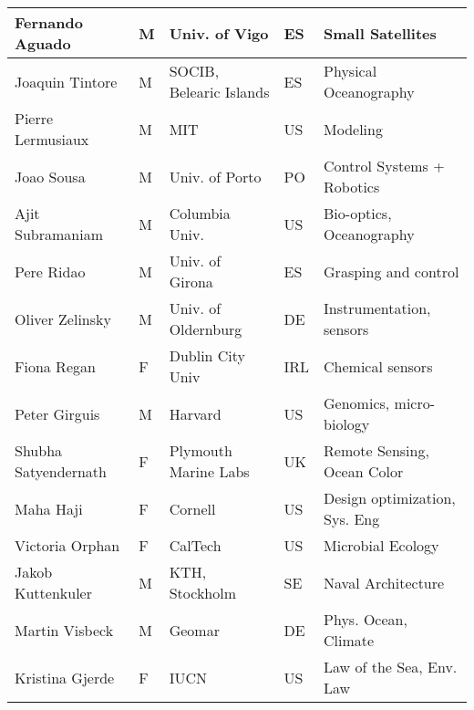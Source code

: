 \begin{table}[]
{\begin{tabular}{|p{3cm}|p{0.5cm}|p{3.5cm}|p{1cm}|p{4cm}|}
\hline
Fernando Aguado          & M   & Univ. of Vigo                         & ES       & Small Satellites                                \\
\hline
Joaquin Tintore          & M   & SOCIB, Belearic Islands               & ES       & Physical Oceanography                           \\
\hline
Pierre Lermusiaux        & M   & MIT                                   & US       & Modeling                                        \\
\hline
Joao Sousa               & M   & Univ. of Porto                        & PO       & Control Systems + Robotics                      \\
\hline
Ajit Subramaniam         & M   & Columbia Univ.                        & US       & Bio-optics, Oceanography                        \\
\hline
Pere Ridao               & M   & Univ. of Girona                       & ES       & Grasping and control                            \\
\hline
Oliver Zelinsky          & M   & Univ. of Oldernburg                   & DE       & Instrumentation, sensors                        \\
\hline
Fiona Regan              & F   & Dublin City Univ                      & IRL      & Chemical sensors                                \\
\hline
Peter Girguis            & M   & Harvard                               & US       & Genomics, micro-biology                         \\
\hline
Shubha Satyendernath     & F   & Plymouth Marine Labs                  & UK       & Remote Sensing, Ocean Color                     \\
\hline
Maha Haji                & F   & Cornell                               & US       & Design optimization, Sys. Eng                   \\
\hline
Victoria Orphan          & F   & CalTech                               & US       & Microbial Ecology                               \\
\hline
Jakob Kuttenkuler        & M   & KTH, Stockholm                        & SE       & Naval Architecture                              \\
\hline
Martin Visbeck           & M   & Geomar                                & DE       & Phys. Ocean, Climate                            \\
\hline
Kristina Gjerde          & F   & IUCN                                  & US       & Law of the Sea, Env. Law                        \\

\end{tabular}}
\end{table}
